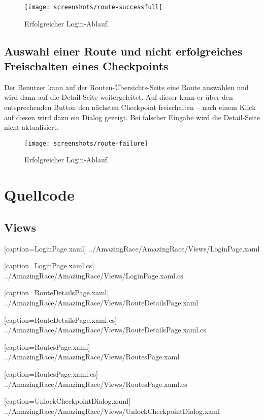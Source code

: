 \documentclass[a4paper,ngerman]{scrartcl}
\begin{document}
\begin{figure}[h]
\centering
\texttt{[image: screenshots/route-successfull]}
\caption{Erfolgreicher Login-Ablauf.}
\label{fig:GraphDb}
\end{figure}

\subsection{Auswahl einer Route und nicht erfolgreiches Freischalten eines Checkpoints}
Der Benutzer kann auf der Routen-Übersichts-Seite eine Route auswählen und wird dann auf die Detail-Seite weitergeleitet. Auf dieser kann er über den entsprechenden Button den nächsten Checkpoint freischalten -- nach einem Klick auf diesen wird dazu ein Dialog gezeigt. Bei falscher Eingabe wird die Detail-Seite nicht aktualisiert.


\begin{figure}[h]
\centering
\texttt{[image: screenshots/route-failure]}
\caption{Erfolgreicher Login-Ablauf.}
\label{fig:GraphDb}
\end{figure}


\newpage
\section{Quellcode}

\subsection{Views}

[caption=LoginPage.xaml]
{../AmazingRace/AmazingRace/Views/LoginPage.xaml}


[caption=LoginPage.xaml.cs]
{../AmazingRace/AmazingRace/Views/LoginPage.xaml.cs}


[caption=RouteDetailsPage.xaml]
{../AmazingRace/AmazingRace/Views/RouteDetailsPage.xaml}


[caption=RouteDetailsPage.xaml.cs]
{../AmazingRace/AmazingRace/Views/RouteDetailsPage.xaml.cs}


[caption=RoutesPage.xaml]
{../AmazingRace/AmazingRace/Views/RoutesPage.xaml}


[caption=RoutesPage.xaml.cs]
{../AmazingRace/AmazingRace/Views/RoutesPage.xaml.cs}


[caption=UnlockCheckpointDialog.xaml]
{../AmazingRace/AmazingRace/Views/UnlockCheckpointDialog.xaml}
\end{document}
